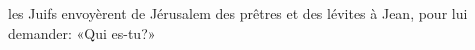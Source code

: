 \encetemps les Juifs envoyèrent de Jérusalem des prêtres et des lévites
	à Jean, pour lui demander:
	«Qui es-tu?»
